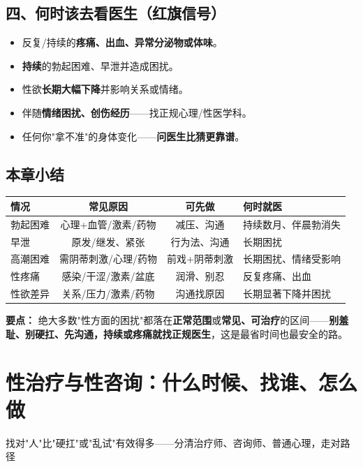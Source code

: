 \documentclass[12pt,UTF8,openany]{ctexbook}
\begin{document}
\section{四、何时该去看医生（红旗信号）}

\begin{itemize}[leftmargin=2em,itemsep=0.3em]
  \item 反复/持续的\textbf{疼痛、出血、异常分泌物或体味}。
  \item \textbf{持续}的勃起困难、早泄并造成困扰。
  \item 性欲\textbf{长期大幅下降}并影响关系或情绪。
  \item 伴随\textbf{情绪困扰、创伤经历}——找正规心理/性医学科。
  \item 任何你"拿不准"的身体变化——\textbf{问医生比猜更靠谱}。
\end{itemize}

\section{本章小结}

\begin{tabularx}{\textwidth}{lCCX}
\toprule
情况 & 常见原因 & 可先做 & 何时就医 \\
\midrule
勃起困难 & 心理+血管/激素/药物 & 减压、沟通 & 持续数月、伴晨勃消失 \\
早泄 & 原发/继发、紧张 & 行为法、沟通 & 长期困扰 \\
高潮困难 & 需阴蒂刺激/心理/药物 & 前戏+阴蒂刺激 & 长期困扰、情绪受影响 \\
性疼痛 & 感染/干涩/激素/盆底 & 润滑、别忍 & 反复疼痛、出血 \\
性欲差异 & 关系/压力/激素/药物 & 沟通找原因 & 长期显著下降并困扰 \\
\bottomrule
\end{tabularx}

\vspace{1em}
\noindent\textbf{要点：} 绝大多数"性方面的困扰"都落在\textbf{正常范围}或\textbf{常见、可治疗}的区间——\textbf{别羞耻、别硬扛、先沟通，持续或疼痛就找正规医生}，这是最省时间也最安全的路。

\chapter{性治疗与性咨询：什么时候、找谁、怎么做}

\begin{center}
\myhei\large 找对"人"比"硬扛"或"乱试"有效得多——分清治疗师、咨询师、普通心理，走对路径
\end{center}
\end{document}
